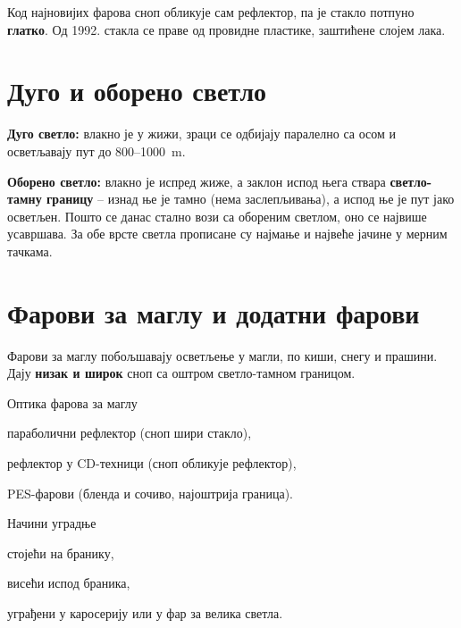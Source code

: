 \documentclass{report}
\begin{document}
Код најновијих фарова сноп обликује сам рефлектор, па је стакло потпуно
\textbf{глатко}. Од 1992. стакла се праве од провидне пластике, заштићене
слојем лака.

\section{Дуго и оборено светло}

\textbf{Дуго светло:} влакно је у жижи, зраци се одбијају паралелно са осом и
осветљавају пут до 800--1000~m.

\textbf{Оборено светло:} влакно је испред жиже, а заклон испод њега ствара
\textbf{светло-тамну границу} -- изнад ње је тамно (нема заслепљивања), а
испод ње је пут јако осветљен. Пошто се данас стално вози са обореним
светлом, оно се највише усавршава. За обе врсте светла прописане су најмање и
највеће јачине у мерним тачкама.

\section{Фарови за маглу и додатни фарови}

Фарови за маглу побољшавају осветљење у магли, по киши, снегу и прашини.
Дају \textbf{низак и широк} сноп са оштром светло-тамном границом.

\begin{podela}{Оптика фарова за маглу}
\begin{lista}
    \item параболични рефлектор (сноп шири стакло),
    \item рефлектор у CD-техници (сноп обликује рефлектор),
    \item PES-фарови (бленда и сочиво, најоштрија граница).
\end{lista}
\end{podela}

\begin{podela}{Начини уградње}
\begin{lista}
    \item стојећи на бранику,
    \item висећи испод браника,
    \item уграђени у каросерију или у фар за велика светла.
\end{lista}
\end{podela}
\end{document}
